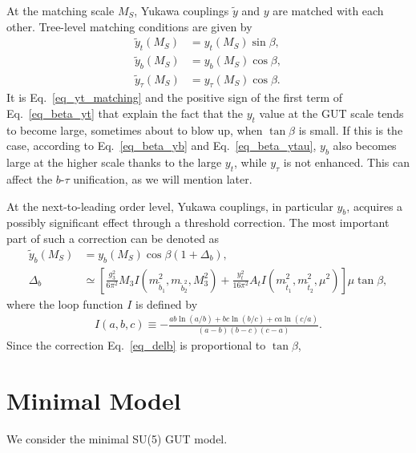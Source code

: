 \documentclass[12pt]{article}
\newcommand{\1}{\mbox{1}\hspace{-0.25em}\mbox{l}}
\begin{document}
At the matching scale $M_S$, Yukawa couplings $\tilde{y}$ and $y$ are
matched with each other.  Tree-level matching conditions are given by
\begin{align}
 \tilde{y}_t (M_S) &= y_t (M_S) \sin \beta,\label{eq_yt_matching}\\
 \tilde{y}_b (M_S) &= y_b (M_S) \cos \beta, \\
 \tilde{y}_\tau (M_S) &= y_\tau (M_S) \cos \beta. 
\end{align}
It is Eq.~\eqref{eq_yt_matching} and the positive sign of the first term
of Eq.~\eqref{eq_beta_yt} that explain the fact that the $y_t$ value at
the GUT scale tends to become large, sometimes about to blow up, when
$\tan \beta$ is small.  If this is the case, according to
Eq.~\eqref{eq_beta_yb} and Eq.~\eqref{eq_beta_ytau}, $y_b$ also becomes
large at the higher scale thanks to the large $y_t$, while $y_\tau$
is not enhanced.  This can affect the $b$-$\tau$ unification, as we
will mention later.

At the next-to-leading order level, Yukawa couplings, in particular
$y_b$, acquires a possibly significant effect through a threshold
correction.  The most important part of such a correction can be denoted
as
\begin{align}
 \tilde{y}_b (M_S) &= y_b (M_S) \cos \beta (1 + \Delta_b),\\
 \Delta_b &\simeq \left[ \frac{g_3^2}{6\pi^2} M_3 I(m_{\tilde{b}_1}^2,
 m_{\tilde{b}_2^2}, M_3^2) + \frac{y_t^2}{16\pi^2} A_t
 I(m_{\tilde{t}_1}^2, m_{\tilde{t}_2}^2, \mu^2) \right] \mu \tan \beta,\label{eq_delb}
\end{align}
where the loop function $I$ is defined by
\begin{align}
 I(a, b, c) \equiv - \frac{ab \ln(a/b) + bc \ln(b/c) + ca
 \ln(c/a)}{(a-b) (b-c) (c-a)}.
\end{align}
Since the correction Eq.~\eqref{eq_delb} is proportional to $\tan
\beta$, 

\section{Minimal Model}
\label{sec:Minimal}
We consider the minimal SU(5) GUT model.
\end{document}
